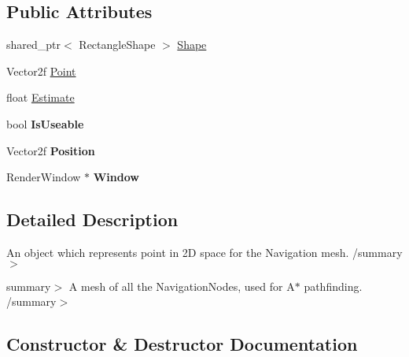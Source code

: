 \subsection*{Public Attributes}
\begin{DoxyCompactItemize}
\item 
shared\+\_\+ptr$<$ Rectangle\+Shape $>$ \hyperlink{struct_engine_1_1_core_1_1_navigation_node_a7a1470734947944ba351df516e2a7cc1}{Shape}
\item 
Vector2f \hyperlink{struct_engine_1_1_core_1_1_navigation_node_a09e7506d996f8bd91b478f3e013fd48e}{Point}
\item 
float \hyperlink{struct_engine_1_1_core_1_1_navigation_node_a707b571c58bffbf140fd4f6ebe6a4f37}{Estimate}
\item 
\mbox{\label{struct_engine_1_1_core_1_1_navigation_node_a4b830ca01eb9e2fdc6fdde3131ce2d84}} 
bool {\bfseries Is\+Useable}
\item 
\mbox{\label{struct_engine_1_1_core_1_1_navigation_node_a48c7e59bd117799ff8006e02ea5fc7f9}} 
Vector2f {\bfseries Position}
\item 
\mbox{\label{struct_engine_1_1_core_1_1_navigation_node_aa5daad8fa8ef6fe2c19f4ff4fec312f9}} 
Render\+Window $\ast$ {\bfseries Window}
\end{DoxyCompactItemize}


\subsection{Detailed Description}
An object which represents point in 2D space for the Navigation mesh. /summary$>$ 

summary$>$ A mesh of all the Navigation\+Nodes, used for A$\ast$ pathfinding. /summary$>$ 

\subsection{Constructor \& Destructor Documentation}
\mbox{\label{struct_engine_1_1_core_1_1_navigation_node_a30f4beef1fa861c8f363fd4a87f6ba98}} 

